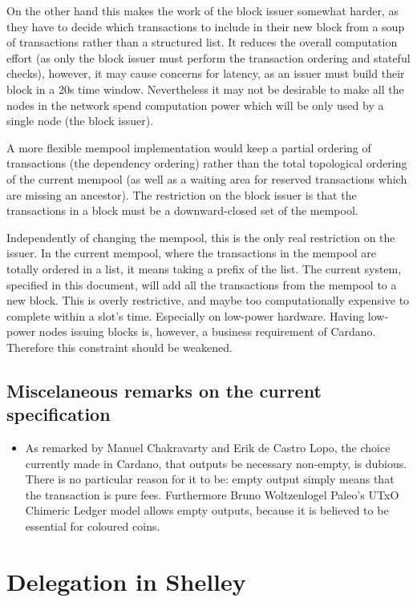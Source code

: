 \documentclass{article}
\begin{document}
On the other hand this makes the work of the block issuer somewhat harder,
as they have to decide which transactions to include in their new
block from a soup of transactions rather than a structured list. It
reduces the overall computation effort (as only the block issuer must
perform the transaction ordering and stateful checks), however, it may
cause concerns for latency, as an issuer must build their block in a
20s time window. Nevertheless it may not be desirable to make all the
nodes in the network spend computation power which will be only used
by a single node (the block issuer).

A more flexible mempool implementation would keep a partial ordering
of transactions (the dependency ordering) rather than the total
topological ordering of the current mempool (as well as a waiting area
for reserved transactions which are missing an ancestor). The
restriction on the block issuer is that the transactions in a block
must be a downward-closed set of the mempool.

Independently of changing the mempool, this is the only real
restriction on the issuer. In the current mempool, where the
transactions in the mempool are totally ordered in a list, it means
taking a prefix of the list. The current system, specified in this
document, will add all the transactions from the mempool to a new
block. This is overly restrictive, and maybe too computationally
expensive to complete within a slot's time. Especially on low-power
hardware. Having low-power nodes issuing blocks is, however, a business
requirement of Cardano. Therefore this constraint should be weakened.

\subsection{Miscelaneous remarks on the current specification}
\label{sec:misc-remarks}
\begin{itemize}
\item As remarked by Manuel Chakravarty and Erik de Castro Lopo, the
  choice currently made in Cardano, that outputs be necessary
  non-empty, is dubious. There is no particular reason for it to be:
  empty output simply means that the transaction is pure
  fees. Furthermore Bruno Woltzenlogel Paleo's UTxO Chimeric Ledger
  model allows empty outputs, because it is believed to be essential
  for coloured coins.
\end{itemize}

\section{Delegation in Shelley}
\label{sec:delegation-shelley}
\end{document}
